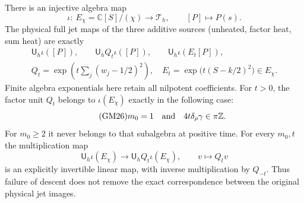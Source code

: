 \begin{hzoctheorem}
There is an injective algebra map
\begin{equation}\tag{GM24}
 \iota:\ E_\chi=\mathbb C[S]/(\chi)\longrightarrow\mathcal T_h,
                 \qquad[P]\longmapsto P(s).
\end{equation}
The physical full jet maps of the three additive sources (unheated,
factor heat, sum heat) are exactly
\begin{equation}\tag{GM25}
 \begin{gathered}
 \mathsf U_h\iota([P]),\qquad
 \mathsf U_h Q_t\iota([P]),\qquad
 \mathsf U_h\iota(E_t[P]),\\
 Q_t=\exp\!\left(t\sum_j(w_j-1/2)^2\right),\quad
 E_t=\exp\bigl(t(S-k/2)^2\bigr)\in E_\chi.
 \end{gathered}
\end{equation}
Finite algebra exponentials here retain all nilpotent coefficients.
For $t>0$, the factor unit $Q_t$ belongs to $\iota(E_\chi)$ exactly
in the following case:
\begin{equation}\tag{GM26}
 m_0=1\quad\hbox{and}\quad4t\delta_\rho\gamma\in\pi\mathbb Z.
\end{equation}
For $m_0\geq2$ it never belongs to that subalgebra at positive time.
For every $m_0,t$ the multiplication map
\begin{equation}\tag{GM27}
 \mathsf U_h\iota(E_\chi)\longrightarrow
                  \mathsf U_h Q_t\iota(E_\chi),\qquad v\longmapsto Q_tv
\end{equation}
is an explicitly invertible linear map, with inverse multiplication
by $Q_{-t}$.  Thus failure of descent does not remove the exact
correspondence between the original physical jet images.
\end{hzoctheorem}
